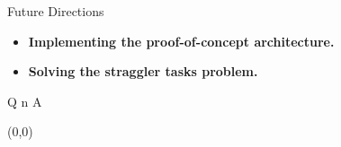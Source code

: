 \documentclass[english]{beamer} %
\begin{document}
\begin{frame}{Future Directions}
\begin{itemize}
\item \textbf{Implementing the proof-of-concept architecture.} 
\item \textbf{Solving the straggler tasks problem.} 
\end{itemize}
\end{frame}

\begin{frame}{Q n A}
\begin{textblock}{1}(0,0)
\end{textblock}
\end{frame}
\end{document}
